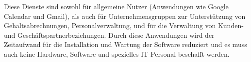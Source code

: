 Diese Dienste sind sowohl für allgemeine Nutzer (Anwendungen wie Google Calendar und Gmail), als auch für Unternehmensgruppen zur Unterstützung von Gehaltsabrechnungen, Personalverwaltung, und für die Verwaltung von Kunden- und Geschäftspartnerbeziehungen. Durch diese Anwendungen wird der Zeitaufwand für die Installation und Wartung der Software reduziert und es muss auch keine Hardware, Software und spezielles IT-Personal beschafft werden. \cite[vgl.][33f.]{HuaweiTechnologies.2023} \\

